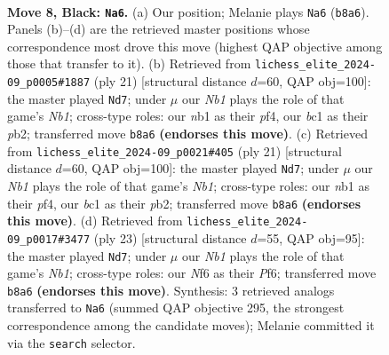 \documentclass[11pt]{article}
\begin{document}
\begin{figure}[p]\centering
\begin{subfigure}{0.46\textwidth}\centering
\resizebox{\linewidth}{!}{%
\newchessgame
\chessboard[
  setfen={rnbq1rk1/pp2bppp/2p1pn2/8/2NP4/6P1/PP2PPBP/RNBQ1RK1 b - - 0 8},
  showmover=false,
  pgfstyle=straightmove, color=movearrow, markmove={b8-a6}
]}
\caption{}
\end{subfigure}\hfill
\begin{subfigure}{0.46\textwidth}\centering
\resizebox{\linewidth}{!}{%
\newchessgame
\chessboard[
  setfen={rnbq1rk1/pp2bppp/2p1p3/8/2NP1P2/8/PP2PPBP/RN1Q1RK1 b - - 0 11},
  showmover=false,
  pgfstyle=straightmove, color=movearrow, markmove={b8-d7}
]}
\caption{}
\end{subfigure}
\\[4pt]
\begin{subfigure}{0.46\textwidth}\centering
\resizebox{\linewidth}{!}{%
\newchessgame
\chessboard[
  setfen={rnbq1rk1/pp2bppp/2p1p3/8/2NP1P2/8/PP2PPBP/RN1Q1RK1 b - - 0 11},
  showmover=false,
  pgfstyle=straightmove, color=movearrow, markmove={b8-d7}
]}
\caption{}
\end{subfigure}\hfill
\begin{subfigure}{0.46\textwidth}\centering
\resizebox{\linewidth}{!}{%
\newchessgame
\chessboard[
  setfen={rnbq1rk1/pp2b1pp/2p1pp2/8/2NP1P2/4P3/PP3PBP/RN1Q1RK1 b - - 0 12},
  showmover=false,
  pgfstyle=straightmove, color=movearrow, markmove={b8-d7}
]}
\caption{}
\end{subfigure}
\caption{\textbf{Move 8, Black: \texttt{Na6}.} (a) Our position; Melanie plays \texttt{Na6} (\texttt{b8a6}). Panels (b)--(d) are the retrieved master positions whose correspondence most drove this move (highest QAP objective among those that transfer to it). (b) Retrieved from \texttt{lichess\_elite\_2024-09\_p0005\#1887} (ply 21) [structural distance $d$=60, QAP obj=100]: the master played \texttt{Nd7}; under $\mu$ our \emph{Nb1} plays the role of that game's \emph{Nb1}; cross-type roles: our \emph{n}b1 as their \emph{p}f4, our \emph{b}c1 as their \emph{p}b2; transferred move \texttt{b8a6} \textbf{(endorses this move)}. (c) Retrieved from \texttt{lichess\_elite\_2024-09\_p0021\#405} (ply 21) [structural distance $d$=60, QAP obj=100]: the master played \texttt{Nd7}; under $\mu$ our \emph{Nb1} plays the role of that game's \emph{Nb1}; cross-type roles: our \emph{n}b1 as their \emph{p}f4, our \emph{b}c1 as their \emph{p}b2; transferred move \texttt{b8a6} \textbf{(endorses this move)}. (d) Retrieved from \texttt{lichess\_elite\_2024-09\_p0017\#3477} (ply 23) [structural distance $d$=55, QAP obj=95]: the master played \texttt{Nd7}; under $\mu$ our \emph{Nb1} plays the role of that game's \emph{Nb1}; cross-type roles: our \emph{N}f6 as their \emph{P}f6; transferred move \texttt{b8a6} \textbf{(endorses this move)}. Synthesis: 3 retrieved analogs transferred to \texttt{Na6} (summed QAP objective 295, the strongest correspondence among the candidate moves); Melanie committed it via the \texttt{search} selector.}
\label{fig:thought-m15}
\end{figure}
\end{document}
